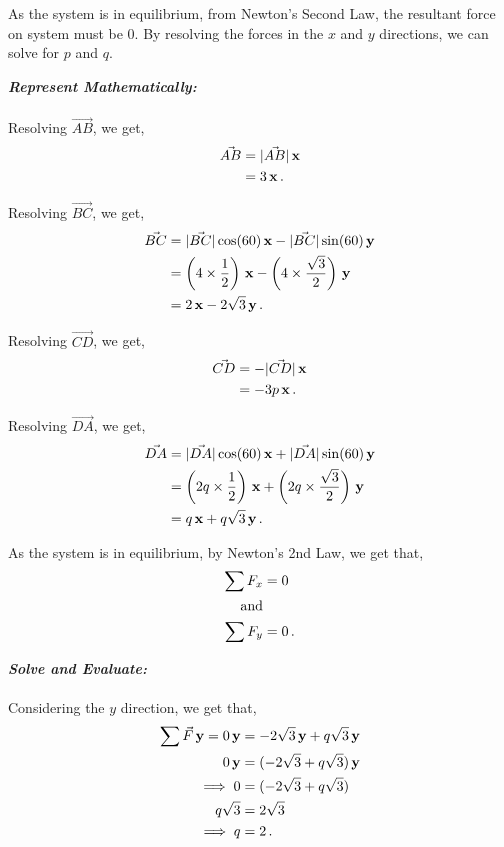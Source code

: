 \begin{subquestions}
As the system is in equilibrium, from Newton's Second Law, the resultant force on system must be 0. By resolving the forces in the $x$ and $y$ directions, we can solve for $p$ and $q$.




\textbf{\textit{Represent Mathematically:}} \\ \\
Resolving $\vec{AB}$, we get,
\begin{align}
	\vec{AB} & = |\vec{AB}|\,\mathbf{x} \nonumber \\
	         & = 3\,\mathbf{x} \,.
\end{align}

Resolving $\vec{BC}$, we get,
\begin{align}
	\vec{BC} & = |\vec{BC}|\cos(60)\,\mathbf{x} - |\vec{BC}|\sin(60)\,\mathbf{y} \nonumber \\
	         & = \left(4\times \frac{1}{2}\right)\,\mathbf{x} - \left(4\times \frac{\sqrt{3}}{2}\right)\,\mathbf{y} \nonumber \\
	         & = 2 \,\mathbf{x} - 2\sqrt{3}\,\mathbf{y} \,.
\end{align}

Resolving $\vec{CD}$, we get,
\begin{align}
	\vec{CD} & = -|\vec{CD}|\,\mathbf{x} \nonumber \\
			 & = -3p\,\mathbf{x} \,.
\end{align}

Resolving $\vec{DA}$, we get,
\begin{align}
	\vec{DA} & = |\vec{DA}|\cos(60)\,\mathbf{x} + |\vec{DA}|\sin(60)\,\mathbf{y} \nonumber \\
	         & = \left(2q\times \frac{1}{2}\right)\,\mathbf{x} + \left(2q\times\frac{\sqrt{3}}{2}\right)\,\mathbf{y} \nonumber \\
	         & = q\,\mathbf{x} + q\sqrt{3}\,\mathbf{y} \,.
\end{align}

As the system is in equilibrium, by Newton's 2nd Law, we get that,
\begin{align}
	\sum F_x & = 0 \nonumber \\
	\text{and} \nonumber \\
	\sum F_y & = 0 \,.
\end{align}




\textbf{\textit{Solve and Evaluate:}} \\ \\
Considering the $y$ direction, we get that,
\begin{align}
	\sum\vec{F}\,\mathbf{y} = 0\,\mathbf{y} & = -2\sqrt{3}\,\mathbf{y} + q\sqrt{3}\,\mathbf{y} \nonumber \\
	                   0\,\mathbf{y} & = (-2\sqrt{3} +q\sqrt{3})\,\mathbf{y} \nonumber \\
	        \implies   0 & =  (-2\sqrt{3} +q\sqrt{3}) \nonumber \\
					q\sqrt{3} & = 2\sqrt{3} \nonumber \\
				   \implies q & = 2 \,.
\end{align}


\end{subquestions}
